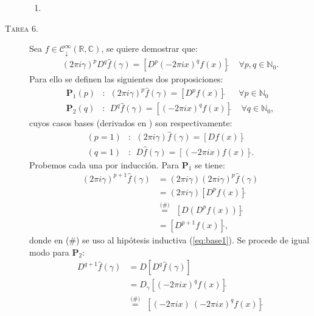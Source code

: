 \documentclass[spanish, fleqn]{article}
\begin{document}
\begin{description}
\begin{enumerate}
		\item
	\end{enumerate}




	\item[\textsc{Tarea 6.}] Sea $f \in \mathcal{C}_{\downarrow}^\infty(\mathbb{R},\mathbb{C})$, se quiere demostrar que:
	\begin{align}
		(2 \pi i \gamma)^p D^q \widehat{f}(\gamma) = \left[D^p (-2 \pi i x)^q f(x)\right]\widehat{} \ \ \ \ \ \forall p,q \in \mathbb{N}_0.
	\label{eq:teo}
	\end{align}
	Para ello se definen las siguientes dos proposiciones:
	\begin{align*}
		\mathbf{P}_1(p) &: \ \ (2 \pi i \gamma)^p \widehat{f}(\gamma) = \left[D^p f(x) \right]\widehat{} \ \ \ \ \ \ \ \forall p \in \mathbb{N}_0 \\
		\mathbf{P}_2(q) &: \ \ D^q \widehat{f}(\gamma) = [(-2 \pi i x)^q f(x)]\widehat{} \ \ \ \ \ \forall q \in \mathbb{N}_0,
	\end{align*}
	cuyos casos bases (derivados en \cite{DymMcKean}) son respectivamente:
	\begin{align}
		(p=1) &: \ \ (2 \pi i \gamma) \widehat{f}(\gamma) = \left[ D f(x) \right]\widehat{} \label{eq:base1} \\
		(q=1) &: \ \ D \widehat{f}(\gamma) =  \left[ (-2 \pi i x) f(x) \right]\widehat{} \label{eq:base2}.
	\end{align}
	Probemos cada una por inducción. Para $\mathbf{P}_1$ se tiene:
	\begin{align*}
		(2 \pi i \gamma)^{p+1} \widehat{f}(\gamma) &= (2 \pi i \gamma)(2 \pi i \gamma)^{p} \widehat{f}(\gamma) \\
		&= (2 \pi i \gamma) \left[ D^p f(x) \right]\widehat{} \\
		&\stackrel{\text{(\#)}}{=} \ \ \left[ D(D^p f(x)) \right]\widehat{} \\
		& = \left[ D^{p+1} f(x) \right]\widehat{},
	\end{align*}
	donde en (\#) se uso al hipótesis inductiva (\ref{eq:base1}). Se procede de igual modo para $\mathbf{P}_2$:
	\begin{align*}
		D^{q+1} \widehat{f}(\gamma) &= D\left[D^{q} \widehat{f}(\gamma)\right] \\
		&= D_{\gamma} \left[(-2 \pi i x)^q f(x) \right]\widehat{} \\
		&\stackrel{\text{(\#)}}{=} \ \ \left[(-2 \pi i x)\ (-2 \pi i x)^q f(x) \right]\widehat{} \\

\end{align*}
\end{description}
\end{document}
